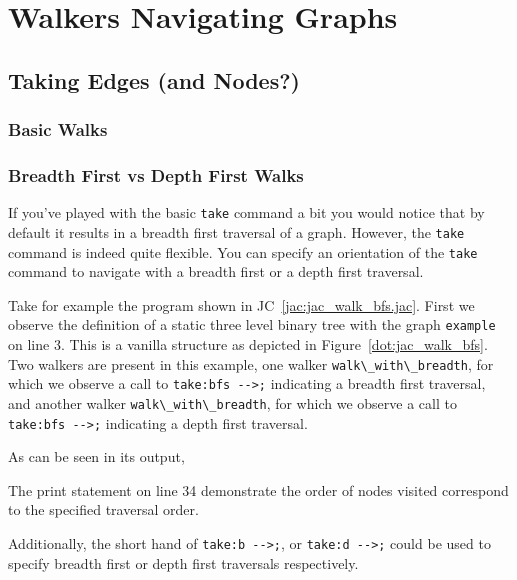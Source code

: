 \chapter{Walkers Navigating Graphs}



\section{Taking Edges (and Nodes?)}

\subsection{Basic Walks}

\par
{}

\par
{}

\subsection{Breadth First vs Depth First Walks}
\par
{}
If you've played with the basic \lstinline{take} command a bit you would notice that by default it results in a breadth first traversal of a graph.
However, the \lstinline{take} command is indeed quite flexible.
You can specify an orientation of the \lstinline{take} command to navigate with a breadth first or a depth first traversal.
\par
{}
\par
Take for example the program shown in JC~\ref{jac:jac_walk_bfs.jac}.
First we observe the definition of a static three level binary tree with the graph \lstinline{example} on line 3.
This is a vanilla structure as depicted in Figure~\ref{dot:jac_walk_bfs}.
Two walkers are present in this example, one walker \lstinline{walk\_with\_breadth}, for which we observe a call to \lstinline{take:bfs -->;} indicating a breadth first traversal, and another walker \lstinline{walk\_with\_breadth}, for which we observe a call to \lstinline{take:bfs -->;} indicating a depth first traversal.
\par
As can be seen in its output,
\par
{}
The print statement on line 34 demonstrate the order of nodes visited correspond to the specified traversal order.
\par
Additionally, the short hand of \lstinline{take:b -->;}, or \lstinline{take:d -->;} could be used to specify breadth first or depth first traversals respectively.


